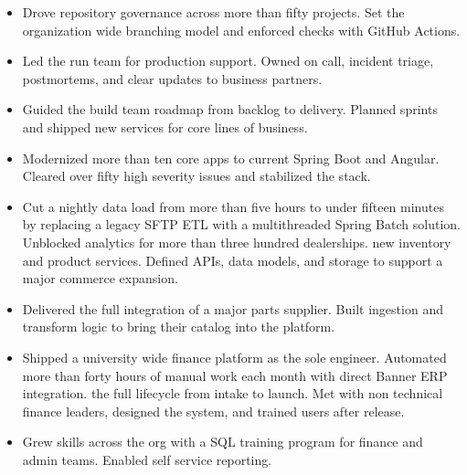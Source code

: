 \begin{itemize}[leftmargin=*]
    \itemProtected data integrity in a high traffic sales platform. Built an idempotent consumer and strong DLQ plan for
    RabbitMQ to remove a class of race conditions.
    \item
    Drove repository governance across more than fifty projects. Set the organization wide branching model and enforced
    checks with GitHub Actions.
    \item
    Led the run team for production support. Owned on call, incident triage, postmortems, and clear updates to business
    partners.
    \item
    Guided the build team roadmap from backlog to delivery. Planned sprints and shipped new services for core lines of
    business.
    \item
    Modernized more than ten core apps to current Spring Boot and Angular. Cleared over fifty high severity issues and
    stabilized the stack.
\end{itemize}
\vspace{\jobGroupBottomMargin}

\begin{itemize}[leftmargin=*]
    \item
    Cut a nightly data load from more than five hours to under fifteen minutes by replacing a legacy SFTP ETL with a
    multithreaded Spring Batch solution. Unblocked analytics for more than three hundred dealerships.
    \itemDesigned new inventory and product services. Defined APIs, data models, and storage to support a major commerce
    expansion.
    \item
    Delivered the full integration of a major parts supplier. Built ingestion and transform logic to bring their catalog
    into the platform.
\end{itemize}
\vspace{\jobGroupBottomMargin}

\begin{itemize}[leftmargin=*]
    \item
    Shipped a university wide finance platform as the sole engineer. Automated more than forty hours of manual work each
    month with direct Banner ERP integration.
    \itemRan the full lifecycle from intake to launch. Met with non technical finance leaders, designed the system, and
    trained users after release.
    \item
    Grew skills across the org with a SQL training program for finance and admin teams. Enabled self service reporting.
\end{itemize}
\vspace{\jobGroupBottomMargin}

